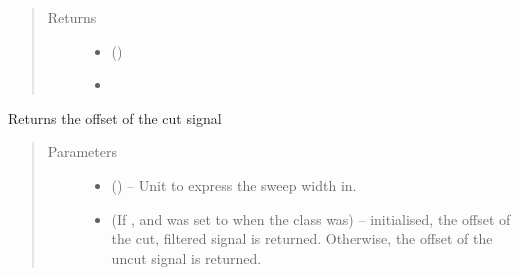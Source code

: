 \documentclass[letterpaper,10pt,english]{sphinxmanual}
\begin{document}
\begin{fulllineitems}
\begin{fulllineitems}
\begin{quote}
\begin{description}
\item[{Returns}] \leavevmode
\sphinxAtStartPar
\begin{itemize}
\item {} 
\sphinxAtStartPar
{} ()

\item {} 
\sphinxAtStartPar
{}

\end{itemize}


\end{description}\end{quote}

\end{fulllineitems}


\begin{fulllineitems}
\label{\detokenize{references/freqfilter:nmrespy.freqfilter.FrequencyFilter.get_offset}}
\sphinxAtStartPar
Returns the offset of the cut signal
\begin{quote}\begin{description}
\item[{Parameters}] \leavevmode\begin{itemize}
\item {} 
\sphinxAtStartPar
{} (\sphinxstyleliteralemphasis{\sphinxupquote{, }}\sphinxstyleliteralemphasis{\sphinxupquote{, }}) – Unit to express the sweep width in.

\item {} 
\sphinxAtStartPar
{} (If , and  was set to  when the class was) – initialised, the offset of the cut, filtered signal is
returned. Otherwise, the offset of the uncut signal is
returned.


\end{itemize}
\end{description}
\end{quote}
\end{fulllineitems}
\end{fulllineitems}
\end{document}
